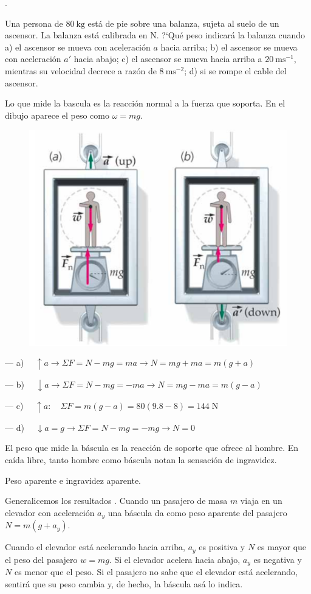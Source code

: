 \begin{prob}.
\begin{multicols}{2}
Una persona de $80 \ \mathrm{kg}$ está de pie sobre una balanza, sujeta al suelo de un ascensor. La balanza está calibrada en $\mathrm{N}$. ?`Qué peso indicará la balanza cuando a) el ascensor se mueva con aceleración $a$ hacia arriba; b) el ascensor se mueva con aceleración $a'$ hacia abajo; c) el ascensor se mueva hacia arriba a $20\ \mathrm{ms}^{-1}$, mientras su velocidad decrece a razón de $8\ \mathrm{ms}^{-2}$; d) si se rompe el cable del ascensor.

Lo que mide la bascula es la reacción normal a la fuerza que soporta. En el dibujo aparece el peso como $\omega=mg$.
	\begin{figure}[H]
	\centering
	\includegraphics[width=.45\textwidth]{imagenes/imagenes03/T03IM21.png}
	\end{figure}
\end{multicols}
\end{prob}
--- a) $\quad \uparrow a \to \Sigma F= N-mg = ma \to N=mg+ma=m(g+a)$

--- b) $\quad \downarrow a \to \Sigma F= N-mg = -ma \to N=mg-ma=m(g-a)$

--- c) $\quad \uparrow a:\quad \Sigma F=m(g-a)=80(9.8-8)=144\; \mathrm{N}$

--- d) $\quad \downarrow a=g \to \Sigma F= N-mg = -mg \to N=0$

El peso que mide la báscula es la reacción de soporte que ofrece al hombre. En caída libre, tanto hombre como báscula notan la sensación de ingravidez. 


\footnotesize{\textsf{Peso aparente e ingravidez aparente.}}
 
\footnotesize{\textsf{Generalicemos los resultados . Cuando un pasajero de masa $m$  viaja en un elevador con aceleración $a_y$  una báscula da como peso aparente del pasajero $N=m(g+a_y)$.}}

\footnotesize{\textsf{Cuando el elevador está acelerando hacia arriba, $a_y$   es positiva y $N$ es mayor que el peso del pasajero $ \textit{w} = mg$. Si el elevador acelera hacia abajo, $a_y$   es negativa y $N$ es menor que el peso. Si el pasajero no sabe que el elevador está acelerando, sentirá que su peso cambia y, de hecho, la báscula asá lo indica.}} 

